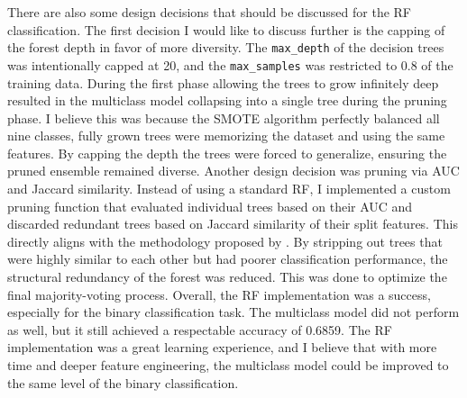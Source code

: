 \nextparagraph
There are also some design decisions that should be discussed for the RF classification. The first decision I would like to discuss further is the capping of the forest depth in favor of more diversity. The \texttt{max\_depth} of the decision trees was intentionally capped at 20, and the \texttt{max\_samples} was restricted to 0.8 of the training data. During the first phase allowing the trees to grow infinitely deep resulted in the multiclass model collapsing into a single tree during the pruning phase. I believe this was because the SMOTE algorithm perfectly balanced all nine classes, fully grown trees were memorizing the dataset and using the same features. By capping the depth the trees were forced to generalize, ensuring the pruned ensemble remained diverse.
Another design decision was pruning via AUC and Jaccard similarity. Instead of using a standard RF, I implemented a custom pruning function that evaluated individual trees based on their AUC and discarded redundant trees based on Jaccard similarity of their split features. This directly aligns with the methodology proposed by \cite{wu2022intrusion}.
By stripping out trees that were highly similar to each other but had poorer classification performance, the structural redundancy of the forest was reduced. This was done to optimize the final majority-voting process.
\nextparagraph
Overall, the RF implementation was a success, especially for the binary classification task. The multiclass model did not perform as well, but it still achieved a respectable accuracy of 0.6859. The RF implementation was a great learning experience, and I believe that with more time and deeper feature engineering, the multiclass model could be improved to the same level of the binary classification. 